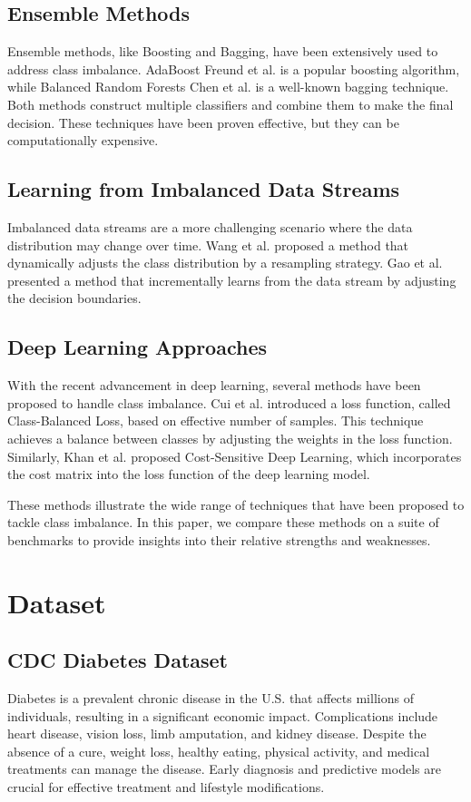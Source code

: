 \documentclass[journal]{IEEEtran}
\begin{document}
\subsection{Ensemble Methods} 
Ensemble methods, like Boosting and Bagging, have been extensively used to address class imbalance. AdaBoost Freund et al. \cite{freund1997} is a popular boosting algorithm, while Balanced Random Forests Chen et al. \cite{chen2004} is a well-known bagging technique. Both methods construct multiple classifiers and combine them to make the final decision. These techniques have been proven effective, but they can be computationally expensive.

\subsection{Learning from Imbalanced Data Streams} 
Imbalanced data streams are a more challenging scenario where the data distribution may change over time. Wang et al. \cite{wang2018} proposed a method that dynamically adjusts the class distribution by a resampling strategy. Gao et al. \cite{gao2015} presented a method that incrementally learns from the data stream by adjusting the decision boundaries.

\subsection{Deep Learning Approaches}
With the recent advancement in deep learning, several methods have been proposed to handle class imbalance. Cui et al. \cite{cui2019} introduced a loss function, called Class-Balanced Loss, based on effective number of samples. This technique achieves a balance between classes by adjusting the weights in the loss function. Similarly, Khan et al. \cite{khan2017} proposed Cost-Sensitive Deep Learning, which incorporates the cost matrix into the loss function of the deep learning model.

These methods illustrate the wide range of techniques that have been proposed to tackle class imbalance. In this paper, we compare these methods on a suite of benchmarks to provide insights into their relative strengths and weaknesses.
	
	
	\section{Dataset}
	\label{sec:dataset}
	
	\subsection{CDC Diabetes Dataset}
	\cite{cdc2022}
	Diabetes is a prevalent chronic disease in the U.S. that affects millions of individuals, resulting in a significant economic impact. Complications include heart disease, vision loss, limb amputation, and kidney disease. Despite the absence of a cure, weight loss, healthy eating, physical activity, and medical treatments can manage the disease. Early diagnosis and predictive models are crucial for effective treatment and lifestyle modifications.
	
\end{document}

